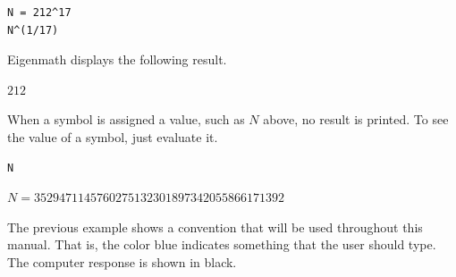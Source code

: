{\color{blue}
\begin{verbatim}
N = 212^17
N^(1/17)
\end{verbatim}
}

\noindent
Eigenmath displays the following result.

\bigskip
\noindent
$212$

\bigskip
\noindent
When a symbol is assigned a value, such as $N$ above,
no result is printed.
To see the value of a symbol, just evaluate it.

{\color{blue}
\begin{verbatim}
N
\end{verbatim}
}

\noindent
$N=3529471145760275132301897342055866171392$

\bigskip
\noindent
The previous example shows a convention that will be used throughout
this manual.
That is, the color blue indicates something that the user should type.
The computer response is shown in black.
